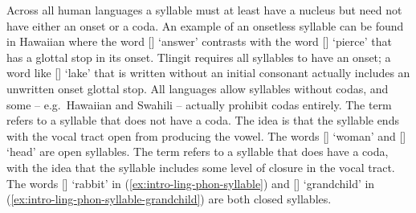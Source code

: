 \ex\label{ex:intro-ling-phon-syllable-grandchild}%
%
\xe

Across all human languages a syllable must at least have a nucleus but need not have either an onset or a coda.
An example of an onsetless syllable can be found in Hawaiian where the word  [] ‘answer’ contrasts with the word  [] ‘pierce’ that has a glottal stop in its onset.
Tlingit requires all syllables to have an onset; a word like  [] ‘lake’ that is written without an initial consonant actually includes an unwritten onset glottal stop.
All languages allow syllables without codas, and some – e.g.\ Hawaiian and Swahili – actually prohibit codas entirely.
The term  refers to a syllable that does not have a coda.
The idea is that the syllable ends with the vocal tract open from producing the vowel.
The words  [] ‘woman’ and  [] ‘head’ are open syllables.
The term  refers to a syllable that does have a coda, with the idea that the syllable includes some level of closure in the vocal tract.
The words  [] ‘rabbit’ in (\ref{ex:intro-ling-phon-syllable}) and  [] ‘grandchild’ in (\ref{ex:intro-ling-phon-syllable-grandchild}) are both closed syllables.

